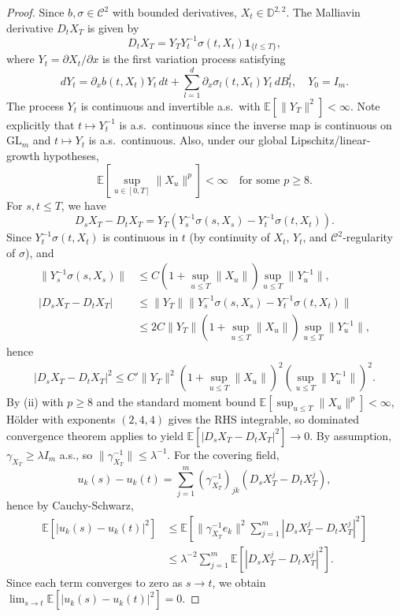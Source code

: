 \documentclass[]{interact}
\newcommand{\1}{\mathbf{1}}
\theoremstyle{plain}%
\theoremstyle{definition}
\theoremstyle{remark}
\numberwithin{equation}{section}
\begin{document}
\begin{proof}
Since $b,\sigma\in\mathcal{C}^2$ with bounded derivatives, $X_t\in\mathbb{D}^{2,2}$. The Malliavin derivative $D_tX_T$ is given by
\[
D_t X_T = Y_T Y_t^{-1} \sigma(t, X_t) \mathbf{1}_{\{t \leq T\}},
\]
where $Y_t = \partial X_t/\partial x$ is the first variation process satisfying
\[
dY_t = \partial_x b(t, X_t) Y_t \, dt + \sum_{l=1}^d \partial_x \sigma_l(t, X_t) Y_t \, dB_t^l, \quad Y_0 = I_m.
\]
The process $Y_t$ is continuous and invertible a.s.\ with $\mathbb{E}[\|Y_T\|^2] < \infty$.
Note explicitly that $t \mapsto Y_t^{-1}$ is a.s.\ continuous since the inverse map is continuous on $\mathrm{GL}_m$ and $t \mapsto Y_t$ is a.s.\ continuous.
Also, under our global Lipschitz/linear-growth hypotheses,
\[
\mathbb{E}\left[\sup_{u\in[0,T]} \|X_u\|^p\right] < \infty \quad \text{for some } p \geq 8.
\]
For $s,t \leq T$, we have
\[
D_s X_T - D_t X_T = Y_T \left( Y_s^{-1} \sigma(s, X_s) - Y_t^{-1} \sigma(t, X_t) \right).
\]
Since $Y_t^{-1}\sigma(t,X_t)$ is continuous in $t$ (by continuity of $X_t$, $Y_t$, and $\mathcal{C}^2$-regularity of $\sigma$), and
\begin{align*}
\|Y_s^{-1} \sigma(s, X_s)\| &\leq C \left(1 + \sup_{u\leq T} \|X_u\|\right) \sup_{u\leq T} \|Y_u^{-1}\|,\\
|D_s X_T - D_t X_T| &\leq \|Y_T\| \|Y_s^{-1} \sigma(s, X_s) - Y_t^{-1} \sigma(t, X_t)\|\\
&\leq 2C \|Y_T\| \left(1 + \sup_{u\leq T} \|X_u\|\right) \sup_{u\leq T} \|Y_u^{-1}\|,
\end{align*}
hence
\begin{align*}
|D_s X_T - D_t X_T|^2 \leq C' \|Y_T\|^2 \left(1 + \sup_{u\leq T} \|X_u\|\right)^2 \left(\sup_{u\leq T} \|Y_u^{-1}\|\right)^2.
\end{align*}
By (ii) with $p \geq 8$ and the standard moment bound $\mathbb{E}[\sup_{u\leq T} \|X_u\|^p] < \infty$, Hölder with exponents $(2,4,4)$ gives the RHS integrable, so dominated convergence theorem applies to yield $\mathbb{E}[|D_s X_T - D_t X_T|^2] \to 0$. 
By assumption, $\gamma_{X_T} \geq \lambda I_m$ a.s., so $\|\gamma_{X_T}^{-1}\| \leq \lambda^{-1}$. For the covering field,
\[
u_k(s) - u_k(t) = \sum_{j=1}^m (\gamma_{X_T}^{-1})_{jk} (D_s X_T^j - D_t X_T^j),
\]
hence by Cauchy-Schwarz,
\begin{align*}
\mathbb{E} \left[ |u_k(s) - u_k(t)|^2 \right] &\leq \mathbb{E} \left[ \|\gamma_{X_T}^{-1} e_k\|^2 \sum_{j=1}^m |D_s X_T^j - D_t X_T^j|^2 \right] \\
&\leq \lambda^{-2} \sum_{j=1}^m \mathbb{E} \left[ |D_s X_T^j - D_t X_T^j|^2 \right].
\end{align*}
Since each term converges to zero as $s \to t$, we obtain $\lim_{s\to t}\mathbb{E}[|u_k(s)-u_k(t)|^2] = 0$.

\end{proof}
\end{document}
